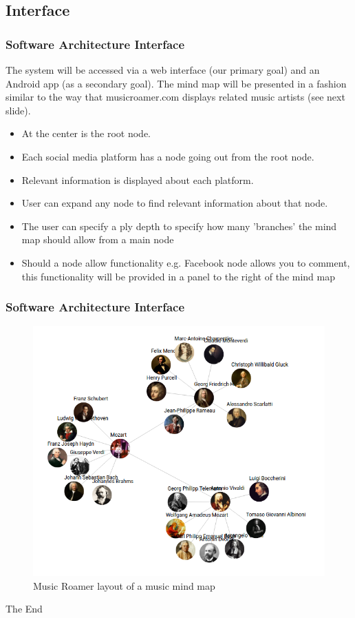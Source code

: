 \documentclass{beamer}
\begin{document}
	\subsection{Interface}
		\begin{frame}
		\frametitle{Software Architecture Interface}
			The system will be accessed via a web interface (our primary goal) and an Android app (as a secondary goal). The mind map will be presented in a fashion similar to the way that musicroamer.com displays related music artists (see next slide).
			
			\begin{itemize}
				\item At the center is the root node.
				\item Each social media platform has a node going out from the root node.
				\item Relevant information is displayed about each platform.
				\item User can expand any node to find relevant information about that node.
				\item The user can specify a ply depth to specify how many 'branches' the mind map should allow from a main node
				\item Should a node allow functionality e.g. Facebook node allows you to comment, this functionality will be provided in a panel to the right of the mind map
			\end{itemize}
		\end{frame}
		\begin{frame}
		\frametitle{Software Architecture Interface}
			\begin{figure}
				\includegraphics[scale=0.3]{musicroamer.png}
				\caption{Music Roamer layout of a music mind map}
			\end{figure}
		\end{frame}

\begin{frame}
	\Huge{\centerline{The End}}
\end{frame}
\end{document}
